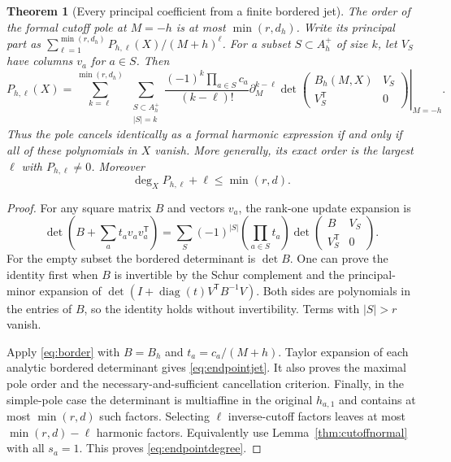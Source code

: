 \documentclass[11pt,letterpaper]{article}
\numberwithin{equation}{section}
\newtheorem{theorem}{Theorem}[section]
\theoremstyle{definition}\newtheorem{definition}[theorem]{Definition}
\theoremstyle{remark}\newtheorem{remark}[theorem]{Remark}
\begin{document}
\begin{theorem}[Every principal coefficient from a finite bordered jet]
\label{thm:endpoints}
The order of the formal cutoff pole at $M=-h$ is at most
$\min(r,d_h)$. Write its principal part as
$\sum_{\ell=1}^{\min(r,d_h)}P_{h,\ell}(X)/(M+h)^\ell$.
For a subset $S\subset A_h^+$ of size $k$, let $V_S$ have columns
$v_a$ for $a\in S$. Then
\begin{equation}\label{eq:endpointjet}
 \boxed{\displaystyle
 P_{h,\ell}(X)=
 \sum_{k=\ell}^{\min(r,d_h)}\ \sum_{\substack{S\subset A_h^+\\|S|=k}}
 \frac{(-1)^k\prod_{a\in S}c_a}{(k-\ell)!}
 \left.
 \partial_M^{k-\ell}
 \det\begin{pmatrix}B_h(M,X)&V_S\\V_S^{\mathsf T}&0\end{pmatrix}
 \right|_{M=-h}.}
\end{equation}
Thus the pole cancels identically as a formal harmonic expression if
and only if all of these polynomials in $X$ vanish. More generally,
its exact order is the largest $\ell$ with $P_{h,\ell}\ne0$.
Moreover
\begin{equation}\label{eq:endpointdegree}
              \deg_X P_{h,\ell}+\ell\le\min(r,d).
\end{equation}
\end{theorem}
\begin{proof}
For any square matrix $B$ and vectors $v_a$, the rank-one update
expansion is
\begin{equation}\label{eq:border}
 \det\left(B+\sum_a t_av_av_a^{\mathsf T}\right)
 =\sum_S(-1)^{|S|}\left(\prod_{a\in S}t_a\right)
          \det\begin{pmatrix}B&V_S\\V_S^{\mathsf T}&0\end{pmatrix}.
\end{equation}
For the empty subset the bordered determinant is $\det B$.
One can prove the identity first when $B$ is invertible by the
Schur complement and the principal-minor expansion of
$\det(I+\operatorname{diag}(t)V^{\mathsf T}B^{-1}V)$.
Both sides are polynomials in the entries of $B$, so the identity holds
without invertibility. Terms with $|S|>r$ vanish.

Apply \eqref{eq:border} with $B=B_h$ and $t_a=c_a/(M+h)$.
Taylor expansion of each analytic bordered determinant gives
\eqref{eq:endpointjet}. It also proves the maximal pole order and the
necessary-and-sufficient cancellation criterion. Finally, in the
simple-pole case the determinant is multiaffine in the original
$h_{a,1}$ and contains at most $\min(r,d)$ such factors. Selecting
$\ell$ inverse-cutoff factors leaves at most $\min(r,d)-\ell$ harmonic
factors. Equivalently use Lemma~\ref{thm:cutoffnormal} with all
$s_a=1$. This proves \eqref{eq:endpointdegree}.
\end{proof}
\end{document}
